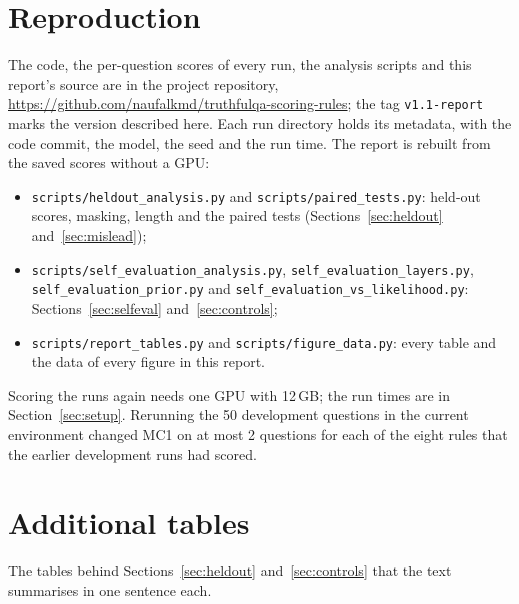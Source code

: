 \documentclass[11pt]{article}
\newcommand{\method}{per-question DoLa-static}
\begin{document}
\section{Reproduction}
\label{app:repro}
The code, the per-question scores of every run, the analysis scripts and this report's source are in the
project repository, \url{https://github.com/naufalkmd/truthfulqa-scoring-rules}; the tag \texttt{v1.1-report} marks
the version described here. Each run directory holds its
metadata, with the code commit, the model, the seed and the run time. The report is rebuilt from the saved scores
without a GPU:
\begin{itemize}\raggedright
\item \texttt{scripts/heldout\_analysis.py} and \texttt{scripts/paired\_tests.py}: held-out scores, masking,
  length and the paired tests (Sections~\ref{sec:heldout} and~\ref{sec:mislead});
\item \texttt{scripts/self\_evaluation\_analysis.py}, \texttt{self\_evaluation\_layers.py},
  \texttt{self\_evaluation\_prior.py} and \texttt{self\_evaluation\_vs\_likelihood.py}: Sections~\ref{sec:selfeval}
  and~\ref{sec:controls};
\item \texttt{scripts/report\_tables.py} and \texttt{scripts/figure\_data.py}: every table and the data of every
  figure in this report.
\end{itemize}
Scoring the runs again needs one GPU with 12\,GB; the run times are in Section~\ref{sec:setup}. Rerunning the 50
development questions in the current environment changed MC1 on at most 2 questions for each of the eight rules
that the earlier development runs had scored.

\section{Additional tables}
\label{app:tables}

The tables behind Sections~\ref{sec:heldout} and~\ref{sec:controls} that the text summarises in one sentence each.

\begin{table}[h]
\centering\small\setlength{\tabcolsep}{4pt}
\caption{The changes from DoLa (generation settings, first row) to \method{} (last row), one at a time, on the
767 held-out questions. Constraint: the adaptive plausibility constraint. Difference: of log-probabilities or of
raw logits; without the constraint the two give identical scores. Layer chosen: at every token by DoLa's
divergence, or once per question by the Jensen--Shannon divergence at $\tau = 0.5$. The difference column compares
each row with the row above; $p$: exact McNemar, Holm-adjusted within the table. A reimplementation of the first
row gives identical scores on every question.}
\label{tab:factorial}
\end{table}
\end{document}
